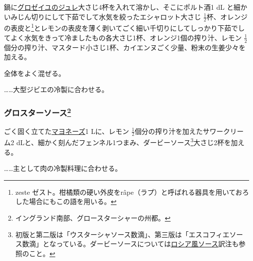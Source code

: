 \begin{recette}


鍋に\protect\hyperlink{gelee-de-groseilles-a}{グロゼイユのジュレ}大さじ4杯を入れて溶かし、そこにポルト酒1
dL と細かいみじん切りにして下茹でして水気を絞ったエシャロット大さじ
\(\frac{1}{2}\)杯、オレンジの表皮と\footnote{zeste
  ゼスト。柑橘類の硬い外皮をrâpe（ラプ）と呼ばれる器具を用いておろした場合にもこの語を用いる。}とレモンの表皮を薄く剥いてごく細い千切りにしてしっかり下茹でしてよく水気をきって冷ましたもの各大さじ1杯、オレンジ1個の搾り汁、レモン
\(\frac{1}{2}\)個分の搾り汁、マスタード小さじ1杯、カイエンヌごく少量、粉末の生姜少々を加える。

全体をよく混ぜる。

\ldots{}\ldots{}大型ジビエの冷製に合わせる。

\atoaki{}

\hypertarget{gloucester-sauce}{%
\subsubsection[グロスターソース]{\texorpdfstring{グロスターソース\footnote{イングランド南部、グロースターシャーの州都。}}{グロスターソース}}\label{gloucester-sauce}}



ごく固く立てた\protect\hyperlink{mayonnaise}{マヨネーズ}1 Lに、レモン
\(\frac{1}{2}\)個分の搾り汁を加えたサワークリーム2
dLと、細かく刻んだフェンネル1つまみ、ダービーソース\footnote{初版と第二版は「ウスターシャソース数滴」、第三版は「エスコフィエソース数滴」となっている。ダービーソースについては\protect\hyperlink{sauce-russe-froide}{ロシア風ソース}訳注も参照のこと。}大さじ2杯を加える。

\ldots{}\ldots{}主として肉の冷製料理に合わせる。


\end{recette}
